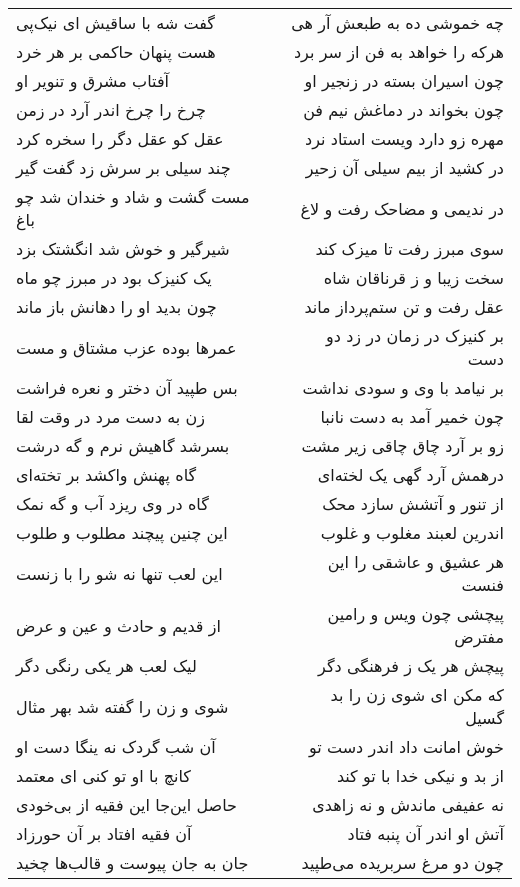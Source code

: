 \begin{center}
\begin{longtable}{l p{0.5cm} r}
گفت شه با ساقیش ای نیک‌پی
&&
چه خموشی ده به طبعش آر هی
\\
هست پنهان حاکمی بر هر خرد
&&
هرکه را خواهد به فن از سر برد
\\
آفتاب مشرق و تنویر او
&&
چون اسیران بسته در زنجیر او
\\
چرخ را چرخ اندر آرد در زمن
&&
چون بخواند در دماغش نیم فن
\\
عقل کو عقل دگر را سخره کرد
&&
مهره زو دارد ویست استاد نرد
\\
چند سیلی بر سرش زد گفت گیر
&&
در کشید از بیم سیلی آن زحیر
\\
مست گشت و شاد و خندان شد چو باغ
&&
در ندیمی و مضاحک رفت و لاغ
\\
شیرگیر و خوش شد انگشتک بزد
&&
سوی مبرز رفت تا میزک کند
\\
یک کنیزک بود در مبرز چو ماه
&&
سخت زیبا و ز قرناقان شاه
\\
چون بدید او را دهانش باز ماند
&&
عقل رفت و تن ستم‌پرداز ماند
\\
عمرها بوده عزب مشتاق و مست
&&
بر کنیزک در زمان در زد دو دست
\\
بس طپید آن دختر و نعره فراشت
&&
بر نیامد با وی و سودی نداشت
\\
زن به دست مرد در وقت لقا
&&
چون خمیر آمد به دست نانبا
\\
بسرشد گاهیش نرم و گه درشت
&&
زو بر آرد چاق چاقی زیر مشت
\\
گاه پهنش واکشد بر تخته‌ای
&&
درهمش آرد گهی یک لخته‌ای
\\
گاه در وی ریزد آب و گه نمک
&&
از تنور و آتشش سازد محک
\\
این چنین پیچند مطلوب و طلوب
&&
اندرین لعبند مغلوب و غلوب
\\
این لعب تنها نه شو را با زنست
&&
هر عشیق و عاشقی را این فنست
\\
از قدیم و حادث و عین و عرض
&&
پیچشی چون ویس و رامین مفترض
\\
لیک لعب هر یکی رنگی دگر
&&
پیچش هر یک ز فرهنگی دگر
\\
شوی و زن را گفته شد بهر مثال
&&
که مکن ای شوی زن را بد گسیل
\\
آن شب گردک نه ینگا دست او
&&
خوش امانت داد اندر دست تو
\\
کانچ با او تو کنی ای معتمد
&&
از بد و نیکی خدا با تو کند
\\
حاصل این‌جا این فقیه از بی‌خودی
&&
نه عفیفی ماندش و نه زاهدی
\\
آن فقیه افتاد بر آن حورزاد
&&
آتش او اندر آن پنبه فتاد
\\
جان به جان پیوست و قالب‌ها چخید
&&
چون دو مرغ سربریده می‌طپید
\\

\end{longtable}
\end{center}
